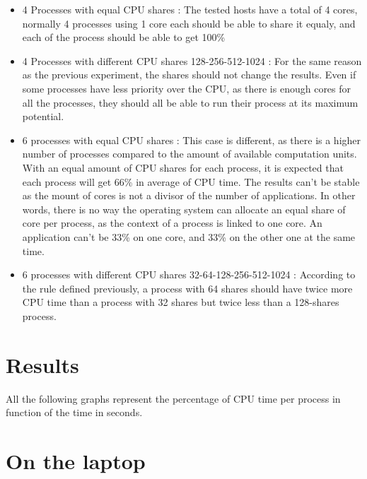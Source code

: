 \begin{itemize}
\item{4 Processes with equal CPU shares : \newline The tested hosts
	have a total of 4 cores, normally 4 processes using 1 core each should
	be able to share it equaly, and each of the process should be able to
	get 100\%
}
\item{4 Processes with different CPU shares 128-256-512-1024 : \newline
	For the same reason as the previous experiment, the
	shares should not change the results. Even if some processes have less
	priority over the CPU, as there is enough cores for all the processes,
	they should all be able to run their process at its maximum potential.
}
\item{6 processes with equal CPU shares : \newline This case is
	different, as there is a higher number of processes compared to the
	amount of available computation units. With an equal amount of CPU
	shares for each process, it is expected that each process will get 66\%
	in average of CPU time.  The results can't be stable as the mount of
	cores is not a divisor of the number of applications. In other words,
	there is no way the operating system can allocate an equal share of
	core per process, as the context of a process is linked to one core. An
	application can't be 33\% on one core, and 33\% on the other one at the
	same time.
}
\item{6 processes with different CPU shares 32-64-128-256-512-1024 : \newline
	According to the rule defined previously, a process with 64 shares
	should have twice more CPU time than a process with 32 shares but twice
	less than a 128-shares process.
}
\end{itemize}

\section{Results}

All the following graphs represent the percentage of CPU time per process
in function of the time in seconds.

\section{On the laptop}

